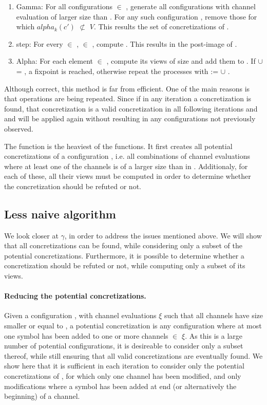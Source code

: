 \begin{enumerate}
\item
Gamma: For all configurations  $\in$ , generate all configurations with channel evaluation of larger size than . For any such configuration , remove those for which $alpha_k(c')$ $\not\subset$ $V$. This results the set of concretizations  of .

\item
step: For every  $\in$ ,  $\in$ , compute . This results in the post-image  of .

\item
Alpha: For each element  $\in$ , compute its views of size  and add them to . If  $\cup$  = , a fixpoint is reached, otherwise repeat the processes with  :=  $\cup$ .
\end{enumerate}

Although correct, this method is far from efficient. One of the main reasons is that operations are being repeated. Since if in any iteration a concretization is found, that concretization is a valid concretization in all following iterations and  and  will be applied again without resulting in any configurations not previously observed.

The function  is the heaviest of the functions. It first creates all potential concretizations of a configuration , i.e. all combinations of channel evaluations where at least one of the channels is of a larger size than in . Additionaly, for each of these, all their views must be computed in order to determine whether the concretization should be refuted or not.

\subsection{Less naive algorithm}
We look closer at $\gamma$, in order to address the issues mentioned above. We will show that all concretizations can be found, while considering only a subset of the potential concretizations. Furthermore, it is possible to determine whether a concretization should be refuted or not, while computing only a subset of its views. 

\paragraph{Reducing the potential concretizations.}
Given a configuration , with channel evaluations $\xi$ such that all channels have size smaller or equal to , a potential concretization is any configuration where at most one symbol has been added to one or more channels  $\in$ $\xi$. As this is a large number of potential configurations, it is desireable to consider only a subset thereof, while still ensuring that all valid concretizations are eventually found. We show here that it is sufficient in each iteration to consider only the potential concretizations of , for which only one channel has been modified, and only modifications where a symbol has been added at end (or alternatively the beginning) of a channel.

